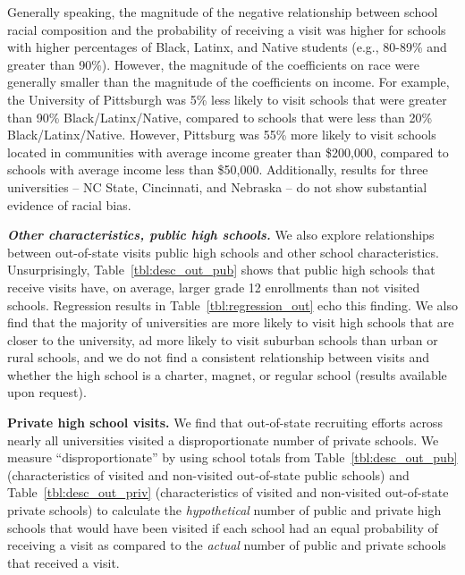 \documentclass[twoside]{article}
\begin{document}
Generally speaking, the magnitude of the negative relationship between school racial composition and the probability of receiving a visit was higher for schools with higher percentages of Black, Latinx, and Native students (e.g., 80-89\% and greater than 90\%). However, the magnitude of the coefficients on race were generally smaller than the magnitude of the coefficients on income. For example, the University of Pittsburgh was 5\% less likely to visit schools that were greater than 90\% Black/Latinx/Native, compared to schools that were less than 20\% Black/Latinx/Native. However, Pittsburg was 55\% more likely to visit schools located in communities with average income greater than \$200,000, compared to schools with average income less than \$50,000. Additionally, results for three universities -- NC State, Cincinnati, and Nebraska -- do not show substantial evidence of racial bias.

\textbf{\textit{Other characteristics, public high schools.}} We also explore relationships between out-of-state visits public high schools and other school characteristics. Unsurprisingly, Table~\ref{tbl:desc_out_pub} shows that public high schools that receive visits have, on average, larger grade 12 enrollments than not visited schools. Regression results in Table~\ref{tbl:regression_out} echo this finding. We also find that the majority of universities are more likely to visit high schools that are closer to the university, ad more likely to visit suburban schools than urban or rural schools, and we do not find a consistent relationship between visits and whether the high school is a charter, magnet, or regular school (results available upon request).


\textbf{Private high school visits.} We find that out-of-state recruiting efforts across nearly all universities visited a disproportionate number of private schools. We measure ``disproportionate'' by using school totals from Table~\ref{tbl:desc_out_pub} (characteristics of visited and non-visited out-of-state public schools) and Table~\ref{tbl:desc_out_priv} (characteristics of visited and non-visited out-of-state private schools) to calculate the \textit{hypothetical} number of public and private high schools that would have been visited if each school had an equal probability of receiving a visit as compared to the \textit{actual} number of public and private schools that received a visit. 
\end{document}
